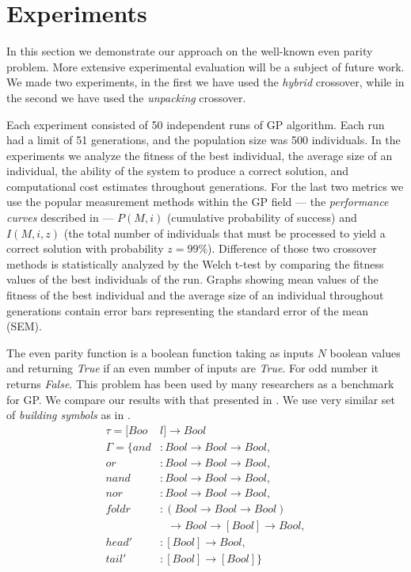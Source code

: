 \documentclass{sig-alternate}
\newcommand{\ar}{\rightarrow\xspace}
\begin{document}
\section{Experiments}
\label{experiments}

In this section we demonstrate our approach on the well-known even parity problem. More extensive experimental evaluation will be a subject of future work. 
We made two experiments, in the first we have used the \textit{hybrid} crossover, while in the second we have used the \textit{unpacking} crossover. 

Each experiment consisted of 50 independent runs 
of GP algorithm. Each run had a limit of 51 generations, and the population size
was 500 individuals.
In the experiments we analyze the fitness of the best individual,
the average size of an individual,
the ability of the system to produce a correct solution, 
and computational cost estimates throughout generations. 
For the last two metrics we use the popular measurement  
methods within the GP field --- the \textit{performance curves}
described in \cite{koza92} --- $P(M,i)$ (cumulative probability of success) 
and $I(M,i,z)$ (the total number of individuals that must be processed 
to yield a correct solution with probability $z =99\%$).
Difference of those two crossover methods is statistically analyzed by the Welch t-test by comparing the fitness values of the best individuals of the run. 
Graphs showing mean values of the fitness of the best individual and
the average size of an individual throughout generations contain error bars representing the standard error of the mean (SEM).

The even parity function is a boolean function taking as inputs $N$
boolean values and returning \textit{True} if an even number of inputs 
are \textit{True}. For odd number it returns \textit{False}.
This problem has been used by many researchers
as a benchmark for GP. 
We compare our results with that presented in \cite{yu01, kes}.
We use very similar set of \textit{building symbols} as in \cite{yu01}. 
\begin{align*}
\tau = [Boo&l] \ar Bool\\
\Gamma = \{
  and   &: Bool \ar Bool \ar Bool    ,\\
  or    &: Bool \ar Bool \ar Bool    ,\\
  nand  &: Bool \ar Bool \ar Bool    ,\\
  nor   &: Bool \ar Bool \ar Bool    ,\\
  foldr &: (Bool \ar Bool \ar Bool) \\
        &~~~\ar Bool \ar [Bool] \ar Bool ,\\
  head' &: [Bool] \ar Bool ,\\
  tail' &: [Bool] \ar [Bool]        \}
\end{align*}
\end{document}
